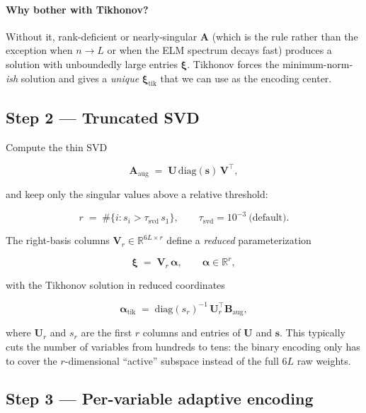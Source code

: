 \documentclass[8pt,a4paper]{article}
\newcommand{\R}{\mathbb{R}}
\newcommand{\bvec}[1]{\bm{#1}}
\newcommand{\Amat}{\bvec{A}}
\newcommand{\Bmat}{\bvec{B}}
\newcommand{\Vr}{\bvec{V}_r}
\theoremstyle{definition}
\theoremstyle{remark}
\begin{document}
\paragraph{Why bother with Tikhonov?}
Without it, rank-deficient or nearly-singular $\Amat$ (which is the
rule rather than the exception when $n \to L$ or when the ELM
spectrum decays fast) produces a solution with unboundedly large
entries $\bm\xi$. Tikhonov forces the minimum-norm-\emph{ish}
solution and gives a \emph{unique} $\bm\xi_{\mathrm{tik}}$ that we
can use as the encoding center.

\subsection{Step 2 --- Truncated SVD}

Compute the thin SVD

\begin{equation}
  \Amat_{\mathrm{aug}} \;=\; \bvec{U}\,\mathrm{diag}(\bm s)\,\bvec{V}^{\top},
\end{equation}

and keep only the singular values above a relative threshold:

\begin{equation}
  r \;=\; \#\{ i : s_i > \tau_{\mathrm{svd}}\, s_1 \},
  \qquad \tau_{\mathrm{svd}} = 10^{-3}\ \text{(default)}.
\end{equation}

The right-basis columns $\Vr \in \R^{6L \times r}$ define a
\emph{reduced} parameterization

\begin{equation}
  \bm\xi \;=\; \Vr\,\bm\alpha, \qquad \bm\alpha \in \R^{r},
\end{equation}

with the Tikhonov solution in reduced coordinates

\begin{equation}
  \bm\alpha_{\mathrm{tik}} \;=\; \mathrm{diag}(s_r)^{-1}
     \,\bvec{U}_r^{\top} \Bmat_{\mathrm{aug}},
\end{equation}

where $\bvec{U}_r$ and $s_r$ are the first $r$ columns and entries of
$\bvec{U}$ and $\bm s$. This typically cuts the number of variables
from hundreds to tens: the binary encoding only has to cover the
$r$-dimensional ``active'' subspace instead of the full $6L$ raw
weights.

\subsection{Step 3 --- Per-variable adaptive encoding}
\end{document}
